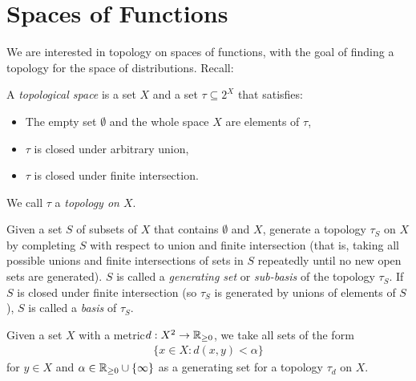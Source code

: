     \section{Spaces of Functions}
      \label{sec:spcoffunc}
      We are interested in topology on spaces of functions, with the goal of finding a topology for the space of distributions.
      Recall:
      \begin{defn}
        A \emph{topological space} is a set $X$ and a set $\tau\subseteq2^X$ that satisfies:
        \begin{itemize}
          \item The empty set $\emptyset$ and the whole space $X$ are elements of $\tau$,
          \item $\tau$ is closed under arbitrary union,
          \item $\tau$ is closed under finite intersection.
        \end{itemize}
        We call $\tau$ a \emph{topology on $X$}.

        Given a set $S$ of subsets of $X$ that contains $\emptyset$ and $X$, generate a topology $\tau_S$ on $X$ by completing $S$ with respect to union and finite intersection (that is, taking all possible unions and finite intersections of sets in $S$ repeatedly until no new open sets are generated).
        $S$ is called a \emph{generating set} or \emph{sub-basis} of the topology $\tau_S$.
        If $S$ is closed under finite intersection (so $\tau_S$ is generated by unions of elements of $S$), $S$ is called a \emph{basis} of $\tau_S$.

        Given a set $X$ with a metric\footnotemark $d:X^2\rightarrow\mathbb{R}_{\ge 0}$, we take all sets of the form 
        \begin{align*}
          \{x\in X:d(x,y)<\alpha\}
        \end{align*}
        for $y\in X$ and $\alpha\in\mathbb{R}_{\ge0}\cup\{\infty\}$ as a generating set for a topology $\tau_d$ on $X$.
      \end{defn}

